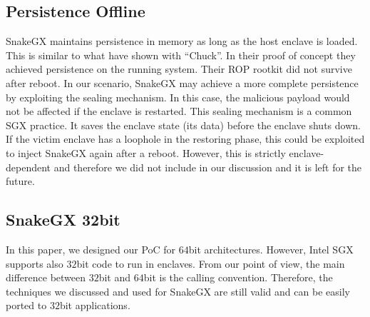 \subsection{Persistence Offline}
SnakeGX maintains persistence in memory as long as the host enclave is loaded.
This is similar to what \cite{vogl2014persistent} have shown with ``Chuck''.
In their proof of concept they achieved persistence on the running system. 
Their ROP rootkit did not survive after reboot.
In our scenario, SnakeGX may achieve a more complete persistence by exploiting 
the sealing mechanism.
In this case, the malicious payload would not be affected if the enclave is 
restarted.
This sealing mechanism is a common SGX practice. It saves the enclave state 
(\ie its data) before the enclave shuts down.
If the victim enclave has a loophole in the restoring phase, this could be 
exploited to inject SnakeGX again after a reboot.
However, this is strictly enclave-dependent and therefore we did not include in 
our discussion and it is left for the future.

\subsection{SnakeGX 32bit}
In this paper, we designed our PoC for $64$bit architectures.
However, Intel SGX supports also $32$bit code to run in enclaves.
From our point of view, the main difference between $32$bit and $64$bit is the 
calling convention.
Therefore, the techniques we discussed and used for SnakeGX are still valid and 
can be easily
ported to $32$bit applications.

